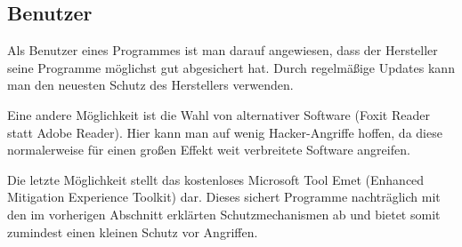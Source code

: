 \subsection{Benutzer}
Als Benutzer eines Programmes ist man darauf angewiesen, dass der Hersteller seine Programme möglichst gut abgesichert hat. Durch regelmäßige Updates kann man den neuesten Schutz des Herstellers verwenden.

Eine andere Möglichkeit ist die Wahl von alternativer Software (Foxit Reader statt Adobe Reader). Hier kann man auf wenig Hacker-Angriffe hoffen, da diese normalerweise für einen großen Effekt weit verbreitete Software angreifen.

Die letzte Möglichkeit stellt das kostenloses Microsoft Tool Emet (Enhanced Mitigation Experience Toolkit) dar. Dieses sichert Programme nachträglich mit den im vorherigen Abschnitt erklärten Schutzmechanismen ab und bietet somit zumindest einen kleinen Schutz vor Angriffen.